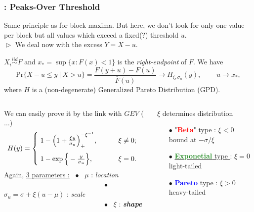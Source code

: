 \documentclass[9pt,xcolor={dvipsnames}]{beamer}
\begin{document}
 \begin{frame}
			\frametitle{ : Peaks-Over Threshold}
			Same principle as for block-maxima. But here, we don't look for only one value per block but  all values which exceed a fixed(?) threshold $u$.\\
			$\vartriangleright$ We deal now with the excess $\boxed{Y=X-u}$.  %
\begin{theorem}  $X_i\stackrel{iid}{\sim} F$ and $x_*=\sup\{x:F(x)<1\}$ is the \emph{right-endpoint} of $F$. We have
\begin{equation*}
	\text{Pr}\big\{X-u\leq y\ |\ X>u\big\}=\frac{F(y+u)-F(u)}{\overline{F}(u)}\longrightarrow H_{\xi,\sigma_u}(y), \ \ \ \ \ \ \ \ \ \ u\to x_*,
	\end{equation*}
where $H$ is a (non-degenerate) Generalized Pareto Distribution (GPD).
			\end{theorem}
	
	\begin{columns}[T]\fontsize{7.5}{7}\selectfont
	\begin{column}{.6\textwidth}	We can easily prove it by the link with $GEV$ ($\dots$)
			\begin{equation*}
H(y)=
\renewcommand{\arraystretch}{0.6}\left\{\begin{array}{@{}l@{\quad}l@{}}
\ 1-\Big(1+\frac{\xi y}{\sigma_u}\Big)_+^{-\xi^{-1}}, \ \ \ \ \ \  \ \ \ \xi\neq 0; \\ 
\vspace{0.0002cm} \\
\ 1-\exp\Big\{-\frac{y}{\sigma_u}\Big\}, \ \ \ \ \ \ \ \ \ \ \ \xi=0.
\end{array}\right.\kern-\nulldelimiterspace
			\end{equation*}
			\newline
			Again, \underline{3 parameters :} \ $\bullet$ \ $\mu$ : \emph{location} \\ \ \ \ \ \ \ \ \ \ \ \ \ \ \ \ \ \ \ \ \ \ \ \ \ \ \ \ \
			 \ $\bullet$ \  $\sigma_u=\sigma+\xi(u-\mu)$ : \emph{scale}  \\
			 \ \ \ \ \ \ \ \ \ \ \ \ \ \ \ \ \ \ \ \ \ \ \ \ \ \ \ \ \ $\bullet$ \ $\boxed{\xi}$ : \textbf{\emph{shape}}
\end{column}
\begin{column}[t]{0.45\textwidth}
\begin{block}{\small $\boxed{\xi}$ determines distribution }
	\begin{itemize}
		\item[$\bullet$]\underline{"\textcolor{red}{\textbf{Beta}}" type} : $\boxed{\xi<0}$ 
		bound at $-\sigma/\xi$
		\item[$\bullet$] \underline{\textcolor{ForestGreen}{\textbf{Exponetial}} type }: $\boxed{\xi=0}$
		light-tailed
		\item[$\bullet$] \underline{\textcolor{blue}{\textbf{Pareto}} type} : $\boxed{\xi>0}$
		heavy-tailed
	\end{itemize}
\end{block}
\end{column}
			

\end{columns}
\end{frame}
\end{document}
